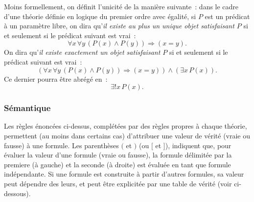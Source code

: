 Moins formellement, on définit l'unicité de la manière suivante : dans le cadre d'une théorie définie en logique du premier ordre avec égalité, si $P$ est un prédicat à un paramètre libre, on dira qu'\textit{il existe au plus un unique objet satisfaisant $P$} si et seulement si le prédicat suivant est vrai : 
\begin{equation*}
    \forall x \, \forall y \, (P(x) \wedge P(y)) \Rightarrow (x = y).
\end{equation*}
On dira qu'\textit{il existe exactement un objet satisfaisant $P$} si et seulement si le prédicat suivant est vrai :
\begin{equation*}
    (\forall x \, \forall y \, (P(x) \wedge P(y)) \Rightarrow (x = y)) \wedge (\exists x \, P(x)).
\end{equation*}
Ce dernier pourra être abrégé en : 
\begin{equation*}
    \exists! x \, P(x).
\end{equation*}

\subsubsection{Sémantique}

Les règles énoncées ci-dessus, complétées par des règles propres à chaque théorie, permettent (au moins dans certains cas) d'attribuer une valeur de vérité (vraie ou fausse) à une formule. Les parenthèses $($ et $)$ (ou $[$ et $]$), indiquent que, pour évaluer la valeur d'une formule (vraie ou fausse), la formule délimitée par la premiere (à gauche) et la seconde (à droite) est évaluée en tant que formule indépendante. 
Si une formule est construite à partir d'autres formules, sa valeur peut dépendre des leurs, et peut être explicitée par une table de vérité (voir ci-dessous). 

